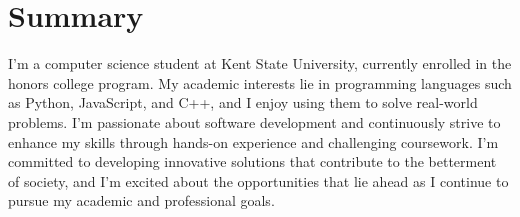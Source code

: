 \documentclass[letterpaper,11pt]{article}
\begin{document}
\section{Summary}
 \begin{itemize}[leftmargin=0.15in, label={}]
    \small{\item{
     I'm a computer science student at Kent State University, currently enrolled in the honors college program. My academic interests lie in programming languages such as Python, JavaScript, and C++, and I enjoy using them to solve real-world problems. I'm passionate about software development and continuously strive to enhance my skills through hands-on experience and challenging coursework. I'm committed to developing innovative solutions that contribute to the betterment of society, and I'm excited about the opportunities that lie ahead as I continue to pursue my academic and professional goals.
    }}
 \end{itemize}


\end{document}
